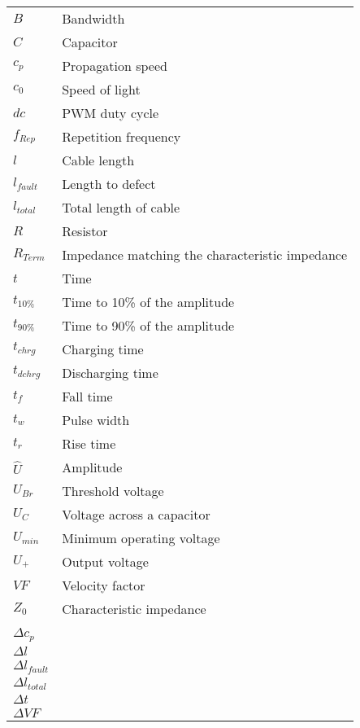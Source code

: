 \begin{longtable}[l]{@{}ll@{}}%
    \( B \) & Bandwidth\\
    \( C \) & Capacitor\\
    \( c_p \) & Propagation speed\\
    \( c_0 \) & Speed of light\\
    \( dc \) & PWM duty cycle \\
    \( f_{Rep} \) & Repetition frequency\\
    \( l \) & Cable length\\
    \( l_{fault} \) & Length to defect\\
    \( l_{total} \) & Total length of cable\\
    \( R \) & Resistor\\
    \( R_{Term} \) & Impedance matching the characteristic impedance\\
    \( t \) & Time\\
    \( t_{10\%} \) & Time to 10\% of the amplitude\\
    \( t_{90\%} \) & Time to 90\% of the amplitude\\
    \( t_{chrg} \) & Charging time\\
    \( t_{dchrg} \) & Discharging time\\
    \( t_f \) & Fall time\\
    \( t_w \) & Pulse width\\
    \( t_{r} \) & Rise time\\
    \( \hat{U} \) & Amplitude\\
    \( U_{Br} \) & Threshold voltage\\
    \( U_C \) & Voltage across a capacitor \\
    \( U_{min} \) & Minimum operating voltage\\
    \( U_{+} \) & Output voltage\\
    \( VF \) & Velocity factor\\
    \( Z_0 \) & Characteristic impedance\\
    & \\
    \( \Delta c_p \) & \\
    \( \Delta l \) & \\
    \( \Delta l_{fault} \) & \\
    \( \Delta l_{total} \) & \\
    \( \Delta t \) & \\
    \( \Delta VF \) & \\

\end{longtable}
